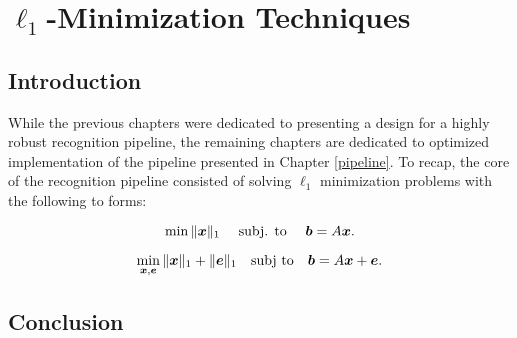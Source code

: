 \chapter{$\ell_1$-Minimization Techniques}
\label{chap:minimization}

\section{Introduction}
While the previous chapters were dedicated to presenting a design for a highly robust
recognition pipeline, the remaining chapters are dedicated to optimized implementation
of the pipeline presented in Chapter \ref{pipeline}.  To recap, the core of the recognition
pipeline consisted of solving $\ell_1$ minimization problems with the following to forms:

\begin{equation} \min \|{\boldsymbol{x}}\|_1\quad \mbox{ subj. to }\quad \boldsymbol{b} = A{\boldsymbol{x}}.
\label{eq:l1min} \end{equation}

\begin{equation}
\min_{{\boldsymbol{x}}, {\boldsymbol{e}}} \| {\boldsymbol{x}} \|_1 + \|{\boldsymbol{e}}\|_1 \quad \textup{subj to} \quad \boldsymbol{b} = A {\boldsymbol{x}} + {\boldsymbol{e}}.
\label{eq:l1min_denoise}
\end{equation}





%
%

\section{Conclusion}


